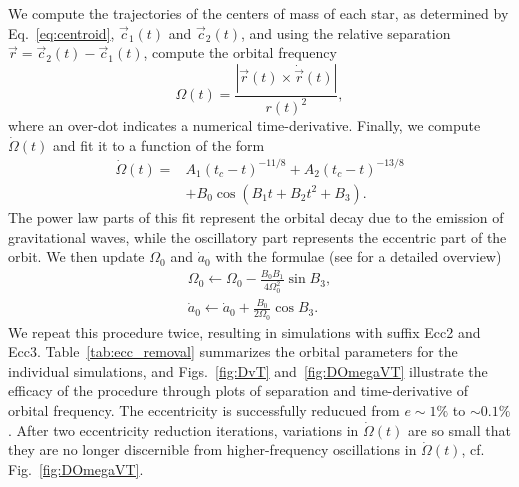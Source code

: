 We
compute the trajectories of the centers of mass of each star, as
  determined by Eq.~\ref{eq:centroid},
$\vec c_1(t)$ and $\vec c_2(t)$, and using the relative separation
$\vec r=\vec c_2(t) - \vec c_1(t)$, compute the orbital frequency
\begin{equation}
\label{eq:Omega}
\Omega(t) = \frac{|\vec r(t)\times\dot{\vec{r}}(t)|}{r(t)^2},
\end{equation}
where an over-dot indicates a numerical time-derivative.
Finally, we compute $\dot{\Omega}(t)$ and fit it to a function of the form
\begin{align}
\dot{\Omega}(t) = & A_1(t_c-t)^{-11/8} + A_2(t_c-t)^{-13/8}\nonumber \\
&+ B_0\cos{(B_1t
  + B_2t^2 + B_3)}.
\end{align}
The power law parts of this fit represent the orbital decay due to the
emission of gravitational waves, while the oscillatory part represents
the eccentric part of the orbit. We then update $\Omega_0$ and
$\dot{a}_0$ with the formulae (see \cite{Buonanno:2010yk} for a
detailed overview)
\begin{align}
  \Omega_0 \leftarrow \Omega_0 - \frac{B_0B_1}{4\Omega_0^2}\sin B_3, \\
  \dot{a}_0\leftarrow \dot{a}_0 +\frac{B_0}{2\Omega_0}\cos B_3.
\end{align}
We repeat this procedure twice, resulting in simulations with suffix
Ecc2 and Ecc3. Table~\ref{tab:ecc_removal} summarizes the orbital
parameters for the individual simulations, and Figs.~\ref{fig:DvT}
and~\ref{fig:DOmegaVT} illustrate the efficacy of the procedure
through plots of separation and time-derivative of orbital frequency.
The eccentricity is successfully reducued from $e\sim 1\%$ to
$\sim 0.1\%$. After two eccentricity reduction iterations, variations
in $\dot\Omega(t)$ are so small that they are no longer discernible
from higher-frequency oscillations in $\dot\Omega(t)$,
cf. Fig.~\ref{fig:DOmegaVT}.

